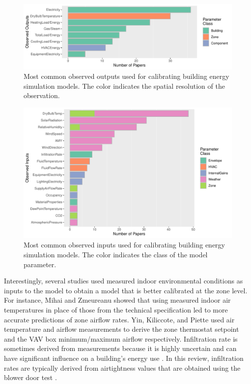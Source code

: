 \documentclass[review]{elsarticle}
\begin{document}
\begin{figure}[!h]
\centering
\includegraphics[width=\textwidth]{figures/obs_output_rank.pdf}
\caption{Most common observed outputs used for calibrating building energy simulation models. The color indicates the spatial resolution of the observation.}
\label{fig:target}
\end{figure}

\begin{figure}[!h]
\centering
\includegraphics[width=\textwidth]{figures/obs_input_rank.pdf}
\caption{Most common observed inputs used for calibrating building energy simulation models. The color indicates the class of the model parameter.}
\label{fig:input}
\end{figure}

Interestingly, several studies used measured indoor environmental conditions as inputs to the model to obtain a model that is better calibrated at the zone level. For instance, Mihai and Zmeureanu \cite{mihai2017bottom} showed that using measured indoor air temperatures in place of those from the technical specification led to more accurate predictions of zone airflow rates. Yin, Kiliccote, and Piette \cite{yin2016linking} used air temperature and airflow measurements to derive the zone thermostat setpoint and the VAV box minimum/maximum airflow respectively. Infiltration rate is sometimes derived from measurements because it is highly uncertain and can have significant influence on a building's energy use \cite{persily2010modeled}. In this review, infiltration rates are typically derived from airtightness values that are obtained using the blower door test \cite{kim2018model, bandera2017towards, vesterberg2016calibration, ramosruiz2016genetic, roberti2015calibrating, zuhaib2019application, fernandez2020novel, escandon2017assessment}.
\end{document}
